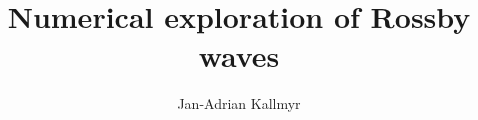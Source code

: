 \documentclass[a4paper, 11pt, twocolumn]{article}
\begin{document}
\title{Numerical exploration of Rossby waves}

\author{Jan-Adrian Kallmyr}

\twocolumn[
  \begin{@twocolumnfalse}
    \maketitle
%    
  \end{@twocolumnfalse}
]















\end{document}
